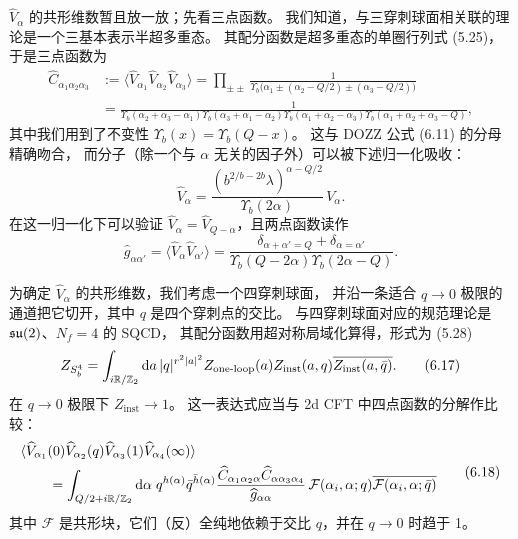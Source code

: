$\widehat{V}_\alpha$ 的共形维数暂且放一放；先看三点函数。
我们知道，与三穿刺球面相关联的理论是一个三基本表示半超多重态。
其配分函数是超多重态的单圈行列式 (5.25)，于是三点函数为
\begin{equation}
\begin{aligned}
\widehat{C}_{\alpha_1\alpha_2\alpha_3}
&:=\langle \widehat{V}_{\alpha_1}\widehat{V}_{\alpha_2}\widehat{V}_{\alpha_3}\rangle
=\prod_{\pm\pm}\frac{1}{\Upsilon_b\big(\alpha_1\pm(\alpha_2-Q/2)\pm(\alpha_3-Q/2)\big)}\\
&=\frac{1}{\Upsilon_b(\alpha_2+\alpha_3-\alpha_1)\Upsilon_b(\alpha_3+\alpha_1-\alpha_2)
\Upsilon_b(\alpha_1+\alpha_2-\alpha_3)\Upsilon_b(\alpha_1+\alpha_2+\alpha_3-Q)},
\end{aligned}
\tag{6.14}
\end{equation}
其中我们用到了不变性 $\Upsilon_b(x)=\Upsilon_b(Q-x)$。
这与 DOZZ 公式 (6.11) 的分母精确吻合，
而分子（除一个与 $\alpha$ 无关的因子外）可以被下述归一化吸收：
\begin{equation}
\widehat{V}_\alpha
=\frac{(b^{2/b-2b}\lambda)^{\alpha-Q/2}}{\Upsilon_b(2\alpha)}\,V_\alpha.
\tag{6.15}
\end{equation}
在这一归一化下可以验证 $\widehat{V}_\alpha=\widehat{V}_{Q-\alpha}$，且两点函数读作
\begin{equation}
\widehat{g}_{\alpha\alpha'}
=\langle\widehat{V}_\alpha\widehat{V}_{\alpha'}\rangle
=\frac{\delta_{\alpha+\alpha'=Q}+\delta_{\alpha=\alpha'}}
{\Upsilon_b(Q-2\alpha)\Upsilon_b(2\alpha-Q)}.
\tag{6.16}
\end{equation}

为确定 $\widehat{V}_\alpha$ 的共形维数，我们考虑一个四穿刺球面，
并沿一条适合 $q\to 0$ 极限的通道把它切开，其中 $q$ 是四个穿刺点的交比。
与四穿刺球面对应的规范理论是 $\mathfrak{su}(2)$、$N_f=4$ 的 SQCD，
其配分函数用超对称局域化算得，形式为 (5.28)
\begin{equation}
Z_{S^4_b}=\int_{i\mathbb{R}/\mathbb{Z}_2}\mathrm{d} a\,|q|^{r^2|a|^2}
Z_{\text{one-loop}}(a)Z_{\text{inst}}(a,q)\overline{Z_{\text{inst}}(a,\bar q)}.
\tag{6.17}
\end{equation}
在 $q\to 0$ 极限下 $Z_{\text{inst}}\to 1$。
这一表达式应当与 2d CFT 中四点函数的分解作比较：
\begin{equation}
\begin{aligned}
&\langle\widehat{V}_{\alpha_1}(0)\widehat{V}_{\alpha_2}(q)
\widehat{V}_{\alpha_3}(1)\widehat{V}_{\alpha_4}(\infty)\rangle\\
&\qquad=\int_{Q/2+i\mathbb{R}/\mathbb{Z}_2}\mathrm{d}\alpha\;
q^{h(\alpha)}\bar q^{\bar h(\alpha)}
\frac{\widehat{C}_{\alpha_1\alpha_2\alpha}\widehat{C}_{\alpha\alpha_3\alpha_4}}{\widehat{g}_{\alpha\alpha}}
\,\mathcal{F}(\alpha_i,\alpha;q)\overline{\mathcal{F}(\alpha_i,\alpha;\bar q)}
\end{aligned}
\tag{6.18}
\end{equation}
其中 $\mathcal{F}$ 是共形块，它们（反）全纯地依赖于交比 $q$，并在 $q\to 0$ 时趋于 1。


